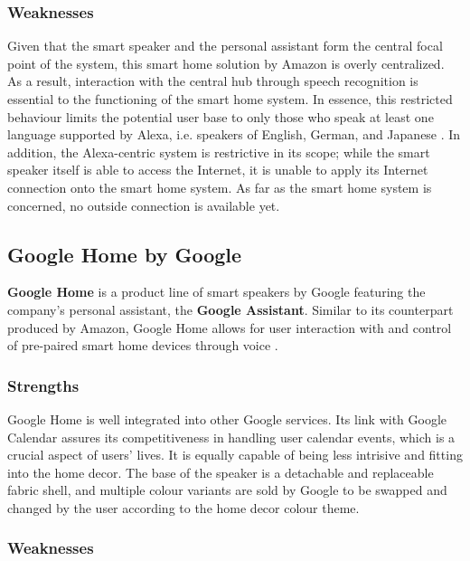 \documentclass[letterpaper, twocolumn, 10pt, conference]{IEEEtran}
\newcommand{\term}[1]{\textbf{#1}}
\begin{document}
\subsubsection*{Weaknesses} \label{sssec:alexa_weaknesses}

Given that the smart speaker and the personal assistant form the central focal point of the system, this smart home solution by Amazon is overly centralized. As a result, interaction with the central hub through speech recognition is essential to the functioning of the smart home system. In essence, this restricted behaviour limits the potential user base to only those who speak at least one language supported by Alexa, i.e. speakers of English, German, and Japanese \cite{hartmans2018amazon}. In addition, the Alexa-centric system is restrictive in its scope; while the smart speaker itself is able to access the Internet, it is unable to apply its Internet connection onto the smart home system. As far as the smart home system is concerned, no outside connection is available yet.

\subsection{Google Home by Google} \label{ssec:google_home}

\term{Google Home} is a product line of smart speakers by Google featuring the company's personal assistant, the \term{Google Assistant}. Similar to its counterpart produced by Amazon, Google Home allows for user interaction with and control of pre-paired smart home devices through voice \cite{bohn2016googlehome}. 

\subsubsection*{Strengths} \label{sssec:google_home_strengths}

Google Home is well integrated into other Google services. Its link with Google Calendar assures its competitiveness in handling user calendar events, which is a crucial aspect of users' lives. It is equally capable of being less intrisive and fitting into the home decor. The base of the speaker is a detachable and replaceable fabric shell, and multiple colour variants are sold by Google to be swapped and changed by the user according to the home decor colour theme.

\subsubsection*{Weaknesses} \label{sssec:google_home_weaknesses}
\end{document}
